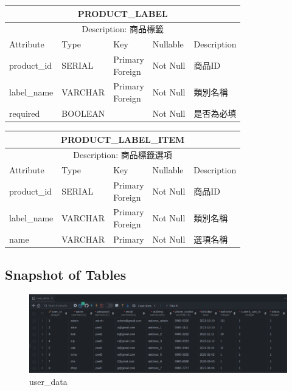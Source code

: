 \documentclass[a4paper, 12pt]{article}
\begin{document}
\noindent\begin{tabular}{ | p{7em} | p{5.5em} | p{5.5em} | p{4.5em} | p{11em} |}
  \hline
  \multicolumn{5}{|c|}{PRODUCT_LABEL} \tabularnewline
  \hline 
  \multicolumn{5}{|c|}{Description: 商品標籤} \tabularnewline
  \hline 
  Attribute & Type & Key & Nullable & Description \\
  \hline
  product_id & SERIAL & \makecell[l]{Primary \\ Foreign} & Not Null & 商品ID \\
  \hline
  label_name & VARCHAR & \makecell[l]{Primary \\ Foreign} & Not Null & 類別名稱 \\
  \hline
  required & BOOLEAN & & Not Null & 是否為必填\\
  \hline
\end{tabular}

\noindent\begin{tabular}{ | p{7em} | p{5.5em} | p{5.5em} | p{4.5em} | p{11em} |}
  \hline
  \multicolumn{5}{|c|}{PRODUCT_LABEL_ITEM} \tabularnewline
  \hline 
  \multicolumn{5}{|c|}{Description: 商品標籤選項} \tabularnewline
  \hline 
  Attribute & Type & Key & Nullable & Description \\
  \hline
  product_id & SERIAL & \makecell[l]{Primary \\ Foreign} & Not Null & 商品ID \\
  \hline
  label_name & VARCHAR & \makecell[l]{Primary \\ Foreign} & Not Null & 類別名稱 \\
  \hline
  name & VARCHAR & Primary & Not Null & 選項名稱\\
  \hline
\end{tabular}

\newpage

\subsection{Snapshot of Tables}
\begin{figure}[hp]
    \centerline{\includegraphics[width=\linewidth]{snapshot/user_data.png}}
    \caption{user_data}
\end{figure}
\end{document}
